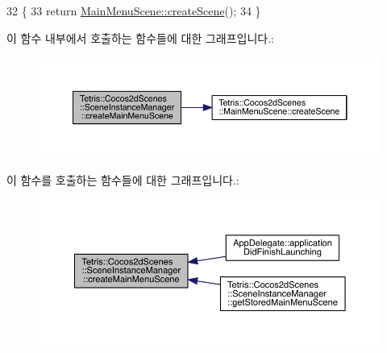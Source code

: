 \begin{DoxyCode}
32                                            \{
33             \textcolor{keywordflow}{return} \hyperlink{class_tetris_1_1_cocos2d_scenes_1_1_main_menu_scene_a46eb7e1d9999c6ed8e9acf49cfcd21cf}{MainMenuScene::createScene}();
34         \}
\end{DoxyCode}
이 함수 내부에서 호출하는 함수들에 대한 그래프입니다.\+:
\nopagebreak
\begin{figure}[H]
\begin{center}
\leavevmode
\includegraphics[width=350pt]{d1/d6f/class_tetris_1_1_cocos2d_scenes_1_1_scene_instance_manager_a7dad1373db969d5c882e2cdc46f7933a_cgraph}
\end{center}
\end{figure}
이 함수를 호출하는 함수들에 대한 그래프입니다.\+:
\nopagebreak
\begin{figure}[H]
\begin{center}
\leavevmode
\includegraphics[width=350pt]{d1/d6f/class_tetris_1_1_cocos2d_scenes_1_1_scene_instance_manager_a7dad1373db969d5c882e2cdc46f7933a_icgraph}
\end{center}
\end{figure}
\mbox{\label{class_tetris_1_1_cocos2d_scenes_1_1_scene_instance_manager_a536188c1cdb7cb46ebd2edc8ebf1f17a}} 
